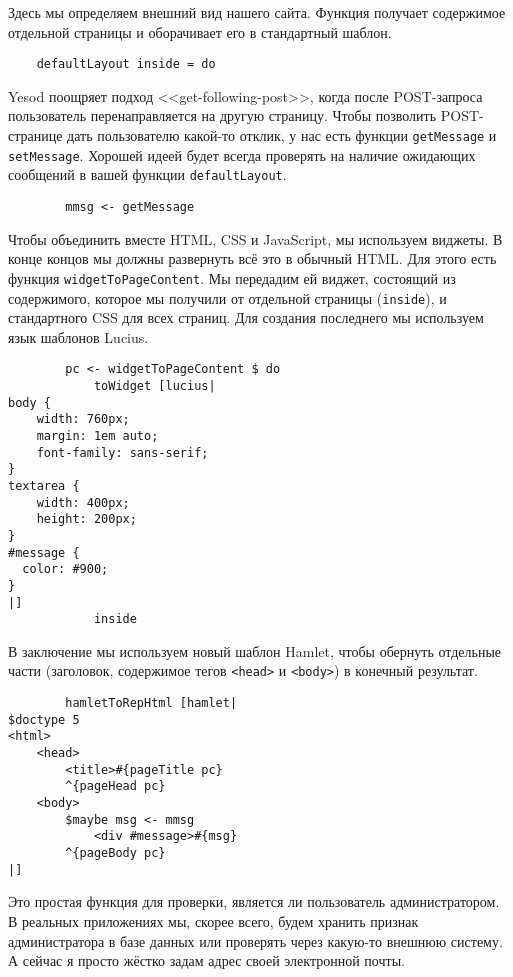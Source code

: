 Здесь мы определяем внешний вид нашего сайта. Функция получает содержимое отдельной страницы и оборачивает его в стандартный шаблон.

\begin{lstlisting}
    defaultLayout inside = do
\end{lstlisting}

Yesod поощряет подход <<get-following-post>>, когда после POST-запроса пользователь перенаправляется на другую страницу. Чтобы позволить POST-странице дать пользователю какой-то отклик, у нас есть функции \lstinline!getMessage! и \lstinline!setMessage!. Хорошей идеей будет всегда проверять на наличие ожидающих сообщений в вашей функции \lstinline!defaultLayout!.

\begin{lstlisting}
        mmsg <- getMessage
\end{lstlisting}

Чтобы объединить вместе HTML, CSS и JavaScript, мы используем виджеты. В конце концов мы должны развернуть всё это в обычный HTML. Для этого есть функция \lstinline!widgetToPageContent!. Мы передадим ей виджет, состоящий из содержимого, которое мы получили от отдельной страницы (\lstinline!inside!), и стандартного CSS для всех страниц. Для создания последнего мы используем язык шаблонов Lucius.

\begin{lstlisting}
        pc <- widgetToPageContent $ do
            toWidget [lucius|
body {
    width: 760px;
    margin: 1em auto;
    font-family: sans-serif;
}
textarea {
    width: 400px;
    height: 200px;
}
#message {
  color: #900;
}
|]
            inside
\end{lstlisting}%

В заключение мы используем новый шаблон Hamlet, чтобы обернуть отдельные части (заголовок, содержимое тегов \lstinline!<head>! и \lstinline!<body>!) в конечный результат.

\begin{lstlisting}
        hamletToRepHtml [hamlet|
$doctype 5
<html>
    <head>
        <title>#{pageTitle pc}
        ^{pageHead pc}
    <body>
        $maybe msg <- mmsg
            <div #message>#{msg}
        ^{pageBody pc}
|]
\end{lstlisting}

Это простая функция для проверки, является ли пользователь администратором. В реальных приложениях мы, скорее всего, будем хранить признак администратора в базе данных или проверять через какую-то внешнюю систему. А сейчас я просто жёстко задам адрес своей электронной почты.

